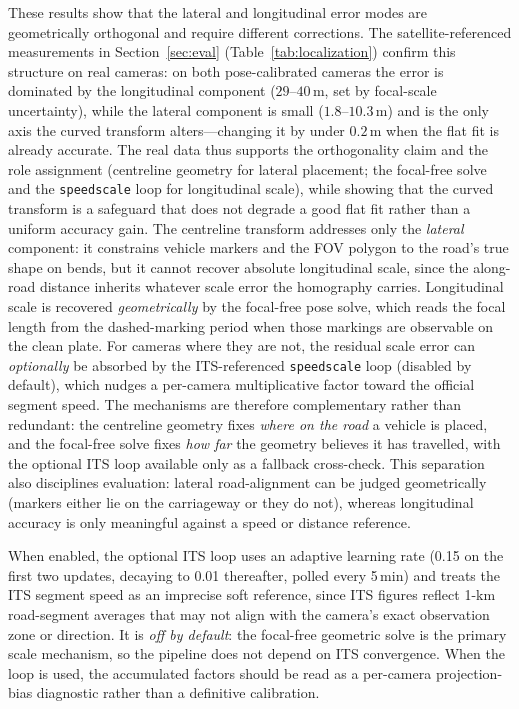 \documentclass[conference]{IEEEtran}
\renewcommand{\_}{\textunderscore\allowbreak}
\begin{document}
These results show that the lateral and longitudinal error modes are geometrically
orthogonal and require different corrections.
The satellite-referenced measurements in Section~\ref{sec:eval}
(Table~\ref{tab:localization}) confirm this structure on real cameras: on both
pose-calibrated cameras the error is dominated by the longitudinal component
($29$--$40$\,m, set by focal-scale uncertainty), while the lateral component is small
($1.8$--$10.3$\,m) and is the only axis the curved transform alters---changing it by
under $0.2$\,m when the flat fit is already accurate. The real data thus supports the
orthogonality claim and the role assignment (centreline geometry for lateral placement;
the focal-free solve and the \texttt{speed\_scale} loop for longitudinal scale), while showing that the curved
transform is a safeguard that does not degrade a good flat fit rather than a uniform
accuracy gain.
The centreline transform addresses only the \emph{lateral} component: it constrains
vehicle markers and the FOV polygon to the road's true shape on bends, but it cannot
recover absolute longitudinal scale, since the along-road distance inherits whatever
scale error the homography carries. Longitudinal scale is recovered \emph{geometrically} by
the focal-free pose solve, which reads the focal length from the dashed-marking period when
those markings are observable on the clean plate. For cameras where they are not, the
residual scale error can \emph{optionally} be absorbed by the ITS-referenced
\texttt{speed\_scale} loop (disabled by default), which nudges a per-camera multiplicative
factor toward the official segment speed.
The mechanisms are therefore complementary rather than redundant: the centreline geometry
fixes \emph{where on the road} a vehicle is placed, and the focal-free solve fixes
\emph{how far} the geometry believes it has travelled, with the optional ITS loop available
only as a fallback cross-check.
This separation also disciplines evaluation: lateral road-alignment can be judged
geometrically (markers either lie on the carriageway or they do not), whereas
longitudinal accuracy is only meaningful against a speed or distance reference.

When enabled, the optional ITS loop uses an adaptive learning rate (0.15 on the first two updates, decaying to 0.01 thereafter, polled every 5\,min) and treats the ITS segment speed as an imprecise soft reference, since ITS figures reflect 1-km road-segment averages that may not align with the camera's exact observation zone or direction. It is \emph{off by default}: the focal-free geometric solve is the primary scale mechanism, so the pipeline does not depend on ITS convergence. When the loop is used, the accumulated factors should be read as a per-camera projection-bias diagnostic rather than a definitive calibration.
\end{document}
